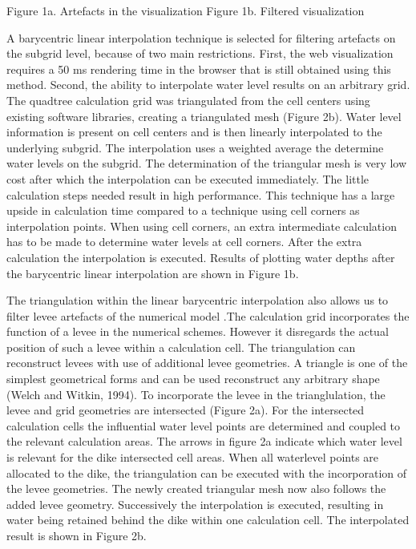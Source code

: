\documentclass[a4paper]{article}
\begin{document}
Figure 1a.  Artefacts in the visualization                      Figure 1b.  Filtered visualization

A barycentric linear interpolation technique is selected for filtering artefacts on the subgrid level, because of two main restrictions. First, the web visualization requires a 50 ms rendering time in the browser that is still obtained using this method. Second, the ability to interpolate water level results on an arbitrary grid. The quadtree calculation grid was triangulated from the cell centers using existing software libraries, creating a triangulated mesh (Figure 2b). Water level information is present on cell centers and is then linearly interpolated to the underlying subgrid. The interpolation uses a weighted average the determine water levels on the subgrid. The determination of the triangular mesh is very low cost after which the interpolation can be executed immediately. The little calculation steps needed result in high performance. This technique has a large upside in calculation time compared to a technique using cell corners as interpolation points. When using cell corners, an extra intermediate calculation has to be made to determine water levels at cell corners. After the extra calculation the interpolation is executed. Results of plotting water depths after the barycentric linear interpolation are shown in Figure 1b.

The triangulation within the linear barycentric interpolation also allows us to filter levee artefacts of the numerical model .The calculation grid incorporates the function of a levee in the numerical schemes. However it disregards the actual position of such a levee within a calculation cell. The triangulation can reconstruct levees with use of additional levee geometries. A triangle is one of the simplest geometrical forms and can be used reconstruct any arbitrary shape (Welch and Witkin, 1994). To incorporate the levee in the trianglulation, the levee and grid geometries are intersected (Figure 2a). For the intersected calculation cells the influential water level points are determined and coupled to the relevant calculation areas. The arrows in figure 2a indicate which water level is relevant for the dike intersected cell areas. When all waterlevel points are allocated to the dike, the triangulation can be executed with the incorporation of the levee geometries. The newly created triangular mesh now also follows the added levee geometry. Successively the interpolation is executed, resulting in water being retained behind the dike within one calculation cell. The interpolated result is shown in Figure 2b.
\end{document}
